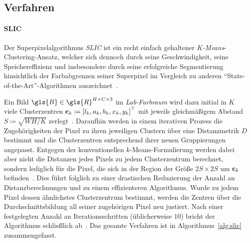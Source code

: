 \subsection{Verfahren}
\label{superpixel_verfahren}


\paragraph{SLIC}
\label{slic}

Der Superpixelalgorithmus \emph{\gls{SLIC}} ist ein recht einfach gehaltener \emph{$K$-Means}-Clustering-Ansatz, welcher sich dennoch durch seine Geschwindigkeit, seine Speichereffizienz und insbesondere durch seine erfolgreiche Segmentierung hinsichtlich der Farbabgrenzen seiner Superpixel im Vergleich zu anderen \enquote{State-of-the-Art}-Algorithmen auszeichnet~\cite{slic, Gadde}.

Ein Bild $\gls{B} \in \gls{R}^{H \times C \times 3}$ im \emph{Lab-Farbraum} wird dazu initial in $K$ viele Clusterzentren $\ve{c}_k \coloneqq {\left[l_k, a_k, b_k, x_k, y_k\right]}^{\top}$  mit jeweils gleichmäßigem Abstand $S \coloneqq \sqrt{WH/K}$ zerlegt~\cite{slic}.
Daraufhin werden in einem iterativen Prozess die Zugehörigkeiten der Pixel zu ihren jeweiligen Clustern über eine Distanzmetrik $D$ bestimmt und die Clusterzentren entsprechend ihrer neuen Gruppierungen angepasst.
Entgegen der konventionellen $k$-Means-Formulierung werden dabei aber nicht die Distanzen jedes Pixels zu jedem Clusterzentrum berechnet, sondern lediglich für die Pixel, die sich in der Region der Größe $2S \times 2S$ um $\mathbf{c}_k$ befinden~\cite{slic}.
Dies führt folglich zu einer drastischen Reduzierung der Anzahl an Distanzberechnungen und zu einem effizienteren Algorithmus.
Wurde zu jedem Pixel dessen ähnlichstes Clusterzentrum bestimmt, werden die Zentren über die Durchschnittsbildung all seiner zugehörigen Pixel neu justiert.
Nach einer festgelegten Anzahl an Iterationsschritten (üblicherweise $10$) bricht der Algorithmus schließlich ab~\cite{slic}.
Das gesamte Verfahren ist in Algorithmus~\ref{alg:slic} zusammengefasst.

